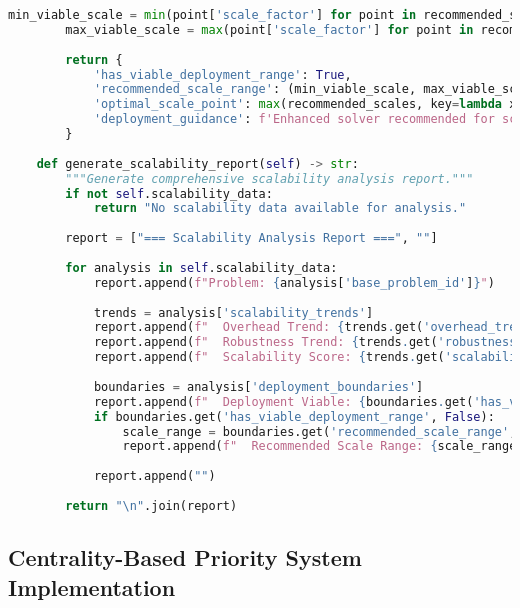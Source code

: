 \begin{lstlisting}[language=Python, caption=Scalability Analysis and Deployment Boundary Assessment]
        min_viable_scale = min(point['scale_factor'] for point in recommended_scales)
        max_viable_scale = max(point['scale_factor'] for point in recommended_scales)
        
        return {
            'has_viable_deployment_range': True,
            'recommended_scale_range': (min_viable_scale, max_viable_scale),
            'optimal_scale_point': max(recommended_scales, key=lambda x: x['cost_benefit_ratio'])['scale_factor'],
            'deployment_guidance': f'Enhanced solver recommended for scale factors {min_viable_scale:.1f}x to {max_viable_scale:.1f}x'
        }
    
    def generate_scalability_report(self) -> str:
        """Generate comprehensive scalability analysis report."""
        if not self.scalability_data:
            return "No scalability data available for analysis."
        
        report = ["=== Scalability Analysis Report ===", ""]
        
        for analysis in self.scalability_data:
            report.append(f"Problem: {analysis['base_problem_id']}")
            
            trends = analysis['scalability_trends']
            report.append(f"  Overhead Trend: {trends.get('overhead_trend', {}).get('direction', 'unknown')}")
            report.append(f"  Robustness Trend: {trends.get('robustness_trend', {}).get('direction', 'unknown')}")
            report.append(f"  Scalability Score: {trends.get('scalability_score', 0.0):.3f}")
            
            boundaries = analysis['deployment_boundaries']
            report.append(f"  Deployment Viable: {boundaries.get('has_viable_deployment_range', False)}")
            if boundaries.get('has_viable_deployment_range', False):
                scale_range = boundaries.get('recommended_scale_range', (0, 0))
                report.append(f"  Recommended Scale Range: {scale_range[0]:.1f}x to {scale_range[1]:.1f}x")
            
            report.append("")
        
        return "\n".join(report)
\end{lstlisting}

\subsection{Centrality-Based Priority System Implementation}
\label{appendix:centrality-priority}


